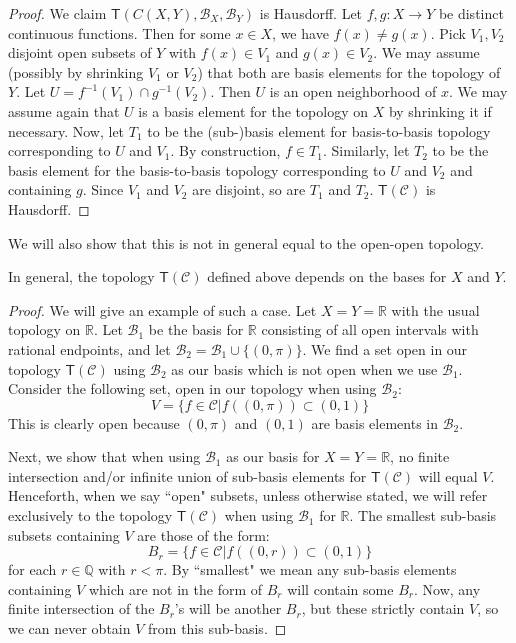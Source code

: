 \documentclass[11pt,letterpaper,fleqn]{memoir} %
\begin{document}
\begin{mathSection}
\begin{proof}
	We claim $\mathsf{T}(C(X,Y), \mathcal{B}_X, \mathcal{B}_Y)$ is Hausdorff. Let $f,g:X\to Y$ be distinct continuous functions. Then for some $x\in X$, we have $f(x)\neq g(x)$. Pick $V_1, V_2$ disjoint open subsets of $Y$ with $f(x)\in V_1$ and $g(x)\in V_2$. We may assume (possibly by shrinking $V_1$ or $V_2$) that both are basis elements for the topology of $Y$. Let $U=f^{-1}(V_1)\cap g^{-1}(V_2)$. Then $U$ is an open neighborhood of $x$. We may assume again that $U$ is a basis element for the topology on $X$ by shrinking it if necessary. Now, let $T_1$ to be the (sub-)basis element for basis-to-basis topology corresponding to $U$ and $V_1$. By construction, $f\in T_1$. Similarly, let $T_2$ to be the basis element for the basis-to-basis topology corresponding to $U$ and $V_2$ and containing $g$. Since $V_1$ and $V_2$ are disjoint, so are $T_1$ and $T_2$. $\mathsf{T}(\mathcal{C})$ is Hausdorff.
\end{proof}

We will also show that this is not in general equal to the open-open topology. 

\begin{prop}
	In general, the topology $\mathsf{T}(\mathcal{C})$ defined above depends on the bases for $X$ and $Y$. 
\end{prop}
\begin{proof}
	We will give an example of such a case. Let $X=Y=\mathbb{R}$ with the usual topology on $\mathbb{R}$. Let $\mathcal{B}_1$ be the basis for $\mathbb{R}$ consisting of all open intervals with rational endpoints, and let $\mathcal{B}_2 = \mathcal{B}_1\cup\{(0,\pi)\}$. We find a set open in our topology $\mathsf{T}(\mathcal{C})$ using $\mathcal{B}_2$ as our basis which is not open when we use $\mathcal{B}_1$. Consider the following set, open in our topology when using $\mathcal{B}_2$:
	$$
	V = \{f\in\mathcal{C}| f((0,\pi))\subset(0,1)\}
	$$
	This is clearly open because $(0,\pi)$ and $(0,1)$ are basis elements in $\mathcal{B}_2$. 
	
	Next, we show that when using $\mathcal{B}_1$ as our basis for $X=Y=\mathbb{R}$, no finite intersection and/or infinite union of sub-basis elements for $\mathsf{T}(\mathcal{C})$ will equal $V$. Henceforth, when we say ``open" subsets, unless otherwise stated, we will refer exclusively to the topology $\mathsf{T}(\mathcal{C})$ when using $\mathcal{B}_1$ for $\mathbb{R}$. The smallest sub-basis subsets containing $V$ are those of the form:
	$$
	B_r = \{f\in\mathcal{C} | f((0,r))\subset(0,1)\}
	$$
	for each $r\in\mathbb{Q}$ with $r<\pi$. By ``smallest" we mean any sub-basis elements containing $V$ which are not in the form of $B_r$ will contain some $B_r$. Now, any finite intersection of the $B_r$'s will be another $B_r$, but these strictly contain $V$, so we can never obtain $V$ from this sub-basis. 
	

\end{proof}
\end{mathSection}
\end{document}
